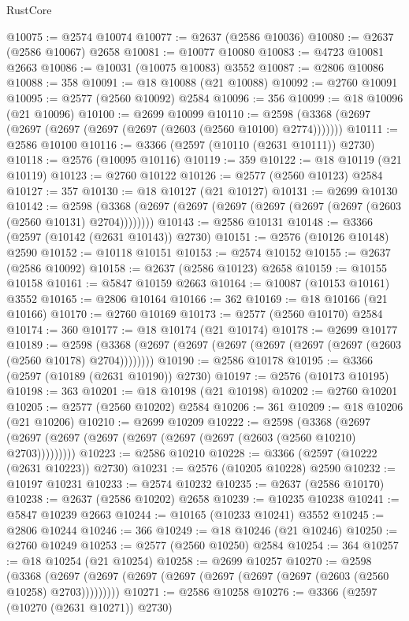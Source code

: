 \begin{lexlean}{RustCore}
\begin{coremodule}
@10075 := @2574 @10074
@10077 := @2637 (@2586 @10036)
@10080 := @2637 (@2586 @10067) @2658
@10081 := @10077 @10080
@10083 := @4723 @10081 @2663
@10086 := @10031 (@10075 @10083) @3552
@10087 := @2806 @10086
@10088 := 358
@10091 := @18 @10088 (@21 @10088)
@10092 := @2760 @10091
@10095 := @2577 (@2560 @10092) @2584
@10096 := 356
@10099 := @18 @10096 (@21 @10096)
@10100 := @2699 @10099
@10110 := @2598 (@3368 (@2697 (@2697 (@2697 (@2697 (@2697 (@2603 (@2560 @10100) @2774)))))))
@10111 := @2586 @10100
@10116 := @3366 (@2597 (@10110 (@2631 @10111)) @2730)
@10118 := @2576 (@10095 @10116)
@10119 := 359
@10122 := @18 @10119 (@21 @10119)
@10123 := @2760 @10122
@10126 := @2577 (@2560 @10123) @2584
@10127 := 357
@10130 := @18 @10127 (@21 @10127)
@10131 := @2699 @10130
@10142 := @2598 (@3368 (@2697 (@2697 (@2697 (@2697 (@2697 (@2697 (@2603 (@2560 @10131) @2704))))))))
@10143 := @2586 @10131
@10148 := @3366 (@2597 (@10142 (@2631 @10143)) @2730)
@10151 := @2576 (@10126 @10148) @2590
@10152 := @10118 @10151
@10153 := @2574 @10152
@10155 := @2637 (@2586 @10092)
@10158 := @2637 (@2586 @10123) @2658
@10159 := @10155 @10158
@10161 := @5847 @10159 @2663
@10164 := @10087 (@10153 @10161) @3552
@10165 := @2806 @10164
@10166 := 362
@10169 := @18 @10166 (@21 @10166)
@10170 := @2760 @10169
@10173 := @2577 (@2560 @10170) @2584
@10174 := 360
@10177 := @18 @10174 (@21 @10174)
@10178 := @2699 @10177
@10189 := @2598 (@3368 (@2697 (@2697 (@2697 (@2697 (@2697 (@2697 (@2603 (@2560 @10178) @2704))))))))
@10190 := @2586 @10178
@10195 := @3366 (@2597 (@10189 (@2631 @10190)) @2730)
@10197 := @2576 (@10173 @10195)
@10198 := 363
@10201 := @18 @10198 (@21 @10198)
@10202 := @2760 @10201
@10205 := @2577 (@2560 @10202) @2584
@10206 := 361
@10209 := @18 @10206 (@21 @10206)
@10210 := @2699 @10209
@10222 := @2598
    (@3368 (@2697 (@2697 (@2697 (@2697 (@2697 (@2697 (@2697 (@2603 (@2560 @10210) @2703)))))))))
@10223 := @2586 @10210
@10228 := @3366 (@2597 (@10222 (@2631 @10223)) @2730)
@10231 := @2576 (@10205 @10228) @2590
@10232 := @10197 @10231
@10233 := @2574 @10232
@10235 := @2637 (@2586 @10170)
@10238 := @2637 (@2586 @10202) @2658
@10239 := @10235 @10238
@10241 := @5847 @10239 @2663
@10244 := @10165 (@10233 @10241) @3552
@10245 := @2806 @10244
@10246 := 366
@10249 := @18 @10246 (@21 @10246)
@10250 := @2760 @10249
@10253 := @2577 (@2560 @10250) @2584
@10254 := 364
@10257 := @18 @10254 (@21 @10254)
@10258 := @2699 @10257
@10270 := @2598
    (@3368 (@2697 (@2697 (@2697 (@2697 (@2697 (@2697 (@2697 (@2603 (@2560 @10258) @2703)))))))))
@10271 := @2586 @10258
@10276 := @3366 (@2597 (@10270 (@2631 @10271)) @2730)

\end{coremodule}
\end{lexlean}

